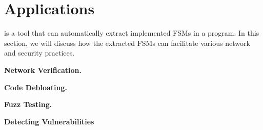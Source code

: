 
\section{Applications}
\Tool{} is a tool that can automatically extract implemented FSMs in a program. 
In this section, we will discuss how the extracted FSMs can facilitate 
various network and security practices.  


\noindent\textbf{Network Verification.}

\noindent\textbf{Code Debloating.}



\noindent\textbf{Fuzz Testing.}

\noindent\textbf{Detecting Vulnerabilities}
